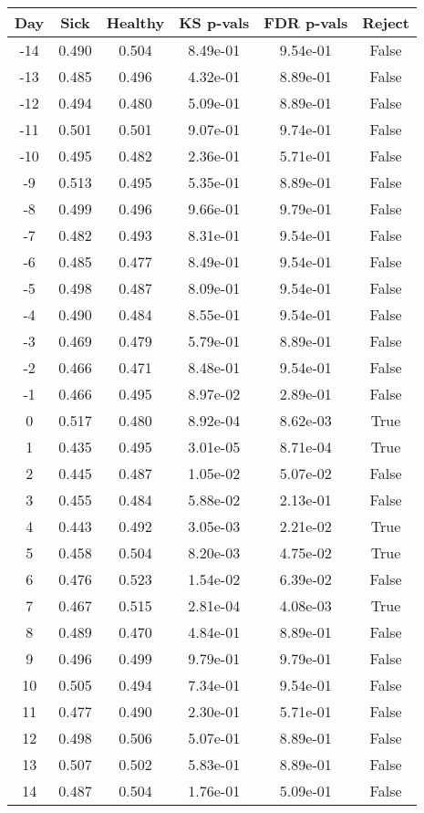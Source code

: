 \begin{tabular}{c|c|c|c|c|c}
Day &  Sick & Healthy &  KS p-vals & FDR p-vals & Reject\\
\hline
-14 & 0.490 &   0.504 &   8.49e-01 &   9.54e-01 &  False\\
-13 & 0.485 &   0.496 &   4.32e-01 &   8.89e-01 &  False\\
-12 & 0.494 &   0.480 &   5.09e-01 &   8.89e-01 &  False\\
-11 & 0.501 &   0.501 &   9.07e-01 &   9.74e-01 &  False\\
-10 & 0.495 &   0.482 &   2.36e-01 &   5.71e-01 &  False\\
 -9 & 0.513 &   0.495 &   5.35e-01 &   8.89e-01 &  False\\
 -8 & 0.499 &   0.496 &   9.66e-01 &   9.79e-01 &  False\\
 -7 & 0.482 &   0.493 &   8.31e-01 &   9.54e-01 &  False\\
 -6 & 0.485 &   0.477 &   8.49e-01 &   9.54e-01 &  False\\
 -5 & 0.498 &   0.487 &   8.09e-01 &   9.54e-01 &  False\\
 -4 & 0.490 &   0.484 &   8.55e-01 &   9.54e-01 &  False\\
 -3 & 0.469 &   0.479 &   5.79e-01 &   8.89e-01 &  False\\
 -2 & 0.466 &   0.471 &   8.48e-01 &   9.54e-01 &  False\\
 -1 & 0.466 &   0.495 &   8.97e-02 &   2.89e-01 &  False\\
  0 & 0.517 &   0.480 &   8.92e-04 &   8.62e-03 &   True\\
  1 & 0.435 &   0.495 &   3.01e-05 &   8.71e-04 &   True\\
  2 & 0.445 &   0.487 &   1.05e-02 &   5.07e-02 &  False\\
  3 & 0.455 &   0.484 &   5.88e-02 &   2.13e-01 &  False\\
  4 & 0.443 &   0.492 &   3.05e-03 &   2.21e-02 &   True\\
  5 & 0.458 &   0.504 &   8.20e-03 &   4.75e-02 &   True\\
  6 & 0.476 &   0.523 &   1.54e-02 &   6.39e-02 &  False\\
  7 & 0.467 &   0.515 &   2.81e-04 &   4.08e-03 &   True\\
  8 & 0.489 &   0.470 &   4.84e-01 &   8.89e-01 &  False\\
  9 & 0.496 &   0.499 &   9.79e-01 &   9.79e-01 &  False\\
 10 & 0.505 &   0.494 &   7.34e-01 &   9.54e-01 &  False\\
 11 & 0.477 &   0.490 &   2.30e-01 &   5.71e-01 &  False\\
 12 & 0.498 &   0.506 &   5.07e-01 &   8.89e-01 &  False\\
 13 & 0.507 &   0.502 &   5.83e-01 &   8.89e-01 &  False\\
 14 & 0.487 &   0.504 &   1.76e-01 &   5.09e-01 &  False\\
\end{tabular}